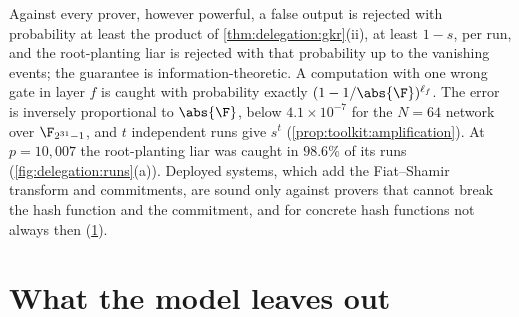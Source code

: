 \begin{refsection}
\questionthree Against every prover, however powerful, a false output is rejected with probability at least the product of \cref{thm:delegation:gkr}(ii), at least $1-s$, per run, and the root-planting liar is rejected with that probability up to the vanishing events; the guarantee is information-theoretic. A computation with one wrong gate in layer $f$ is caught with probability exactly $(1-1/\abs{\F})^{\ell_f}$. The error is inversely proportional to $\abs{\F}$, below $4.1\times10^{-7}$ for the $N=64$ network over $\F_{2^{31}-1}$, and $t$ independent runs give $s^t$ (\cref{prop:toolkit:amplification}). At $p=10{,}007$ the root-planting liar was caught in $98.6\%$ of its runs (\cref{fig:delegation:runs}(a)). Deployed systems, which add the Fiat--Shamir transform and commitments, are sound only against provers that cannot break the hash function and the commitment, and for concrete hash functions not always then (\cref{sec:delegation:leaves}).


\section{What the model leaves out}\label{sec:delegation:leaves}


\end{refsection}
